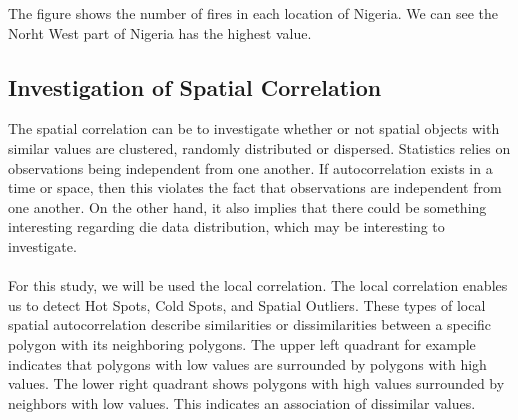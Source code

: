 \documentclass[11pt,a4paper]{article}
\begin{document}
    
    The figure shows the number of fires in each location of Nigeria. We can
see the Norht West part of Nigeria has the highest value.

    \hypertarget{investigation-of-spatial-correlation}{%
\subsection{Investigation of Spatial
Correlation}\label{investigation-of-spatial-correlation}}

    The spatial correlation can be to investigate whether or not spatial objects with similar
values are clustered, randomly distributed or dispersed.
Statistics relies on observations being
independent from one another. If autocorrelation exists in a time or
space, then this violates the fact that observations are independent
from one another. On the other hand, it also implies that there could be
something interesting regarding die data distribution, which may be
interesting to investigate.
\paragraph{}
For this study, we will be used the local correlation. The local correlation enables us to detect Hot Spots, Cold Spots, and Spatial Outliers.
  These types of local spatial autocorrelation describe similarities or
dissimilarities between a specific polygon with its neighboring
polygons. The upper left quadrant for example indicates that polygons
with low values are surrounded by polygons with high values. The lower
right quadrant shows polygons with high values surrounded by neighbors
with low values. This indicates an association of dissimilar values.
\end{document}
